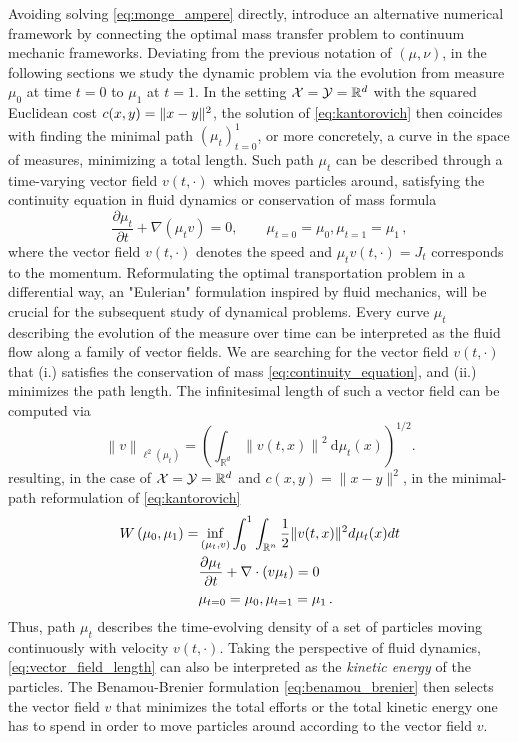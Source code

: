 Avoiding solving \eqref{eq:monge_ampere} directly, \citet{benamou2000computational} introduce an alternative numerical framework by connecting the optimal mass transfer problem to continuum mechanic frameworks.
Deviating from the previous notation of $(\mu, \nu)$, in the following sections we study the dynamic problem via the evolution from measure $\mu_0$ at time $t=0$ to $\mu_1$ at $t=1$. 
In the setting ${\mathcal{X}} = {\mathcal{Y}} = \mathbb{R}^d$ with the squared Euclidean cost $c(x, y) = \lVert x-y\rVert^2$, the solution of \eqref{eq:kantorovich} then coincides with finding the minimal path $(\mu_t)_{t=0}^1$, or more concretely, a curve in the space of measures, minimizing a total length.  
Such path $\mu_t$ can be described through a time-varying vector field $v(t, \cdot)$ which moves particles around, satisfying the continuity equation in fluid dynamics or conservation of mass formula
\begin{equation} \label{eq:continuity_equation}
	\frac{\partial \mu_t}{\partial t}+\nabla\left(\mu_t v\right)= 0, \qquad \mu_{t=0}=\mu_0, \mu_{t=1}=\mu_1\,,
\end{equation}
where the vector field $v(t, \cdot)$ denotes the speed and $\mu_t v(t, \cdot) = J_t$ corresponds to the momentum.
Reformulating the optimal transportation problem in a differential way, an "Eulerian" formulation inspired by fluid mechanics, will be crucial for the subsequent study of dynamical problems.
Every curve $\mu_t$ describing the evolution of the measure over time can be interpreted as the fluid flow along a family of vector fields. We are searching for the vector field $v(t, \cdot)$ that (i.) satisfies the conservation of mass \eqref{eq:continuity_equation}, and (ii.) minimizes the path length.
The infinitesimal length of such a vector field can be computed via 
\begin{equation} \label{eq:vector_field_length}
	\left\|v\right\|_{\ell^2\left(\mu_t\right)}=\left(\int_{\mathbb{R}^d}\left\|v(t, x)\right\|^2 \mathrm{~d} \mu_t(x)\right)^{1 / 2}.
\end{equation}
resulting, in the case of ${\mathcal{X}} = {\mathcal{Y}} = \mathbb{R}^d$ and $c(x, y)=\|x-y\|^2$, in the minimal-path reformulation of \eqref{eq:kantorovich}
\begin{align}  \label{eq:benamou_brenier}
	W\left(\mu_0, \mu_1\right)=& \inf _{(\mu_t, v)} \int_0^1 \int_{\mathbb{R}^n}\frac{1}{2}\lVert v(t, x)\rVert^2 d\mu_t(x) d t \\
	& \nonumber \frac{\partial \mu_t}{\partial t}+\nabla \cdot(v \mu_t)=0 \\
	& \nonumber \mu_{t=0}=\mu_0, \mu_{t=1}=\mu_1\, .
\end{align}
Thus, path $\mu_t$ describes the time-evolving density of a set of particles moving continuously with velocity $v(t, \cdot)$.
Taking the perspective of fluid dynamics, \eqref{eq:vector_field_length} can also be interpreted as the \emph{kinetic energy} of the particles.
The Benamou-Brenier formulation \eqref{eq:benamou_brenier} then selects the vector field $v$ that minimizes the total efforts or the total kinetic energy one has to spend in order to move particles around according to the vector field $v$. \\


